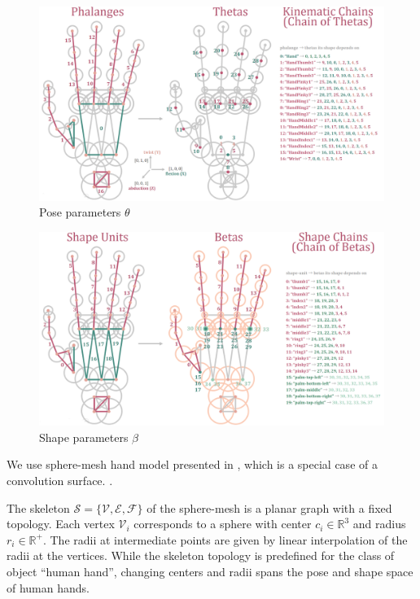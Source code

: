 \begin{figure}[h!]
\centering
\includegraphics[width=1\linewidth]{figures/thetas}
\caption{Pose parameters $\theta$}
\label{fig:thetas}
\end{figure}

\begin{figure}[h!]
\centering
\includegraphics[width=1\linewidth]{figures/betas}
\caption{Shape parameters $\beta$}
\label{fig:betas}
\end{figure}

We use sphere-mesh hand model presented in \cite{tkach2016sphere}, which is a special case of a convolution surface. \textbf{\color{accent}{Maybe briefly recap advantages of sphere-meshes hand model representation}}. 

The skeleton $\mathcal{S} = \{\mathcal{V}, \mathcal{E}, \mathcal{F}\}$ of the sphere-mesh is a planar graph with a fixed topology. Each vertex $\mathcal{V}_i$ corresponds to a sphere with center $c_i \in \mathbb{R}^3$ and radius $r_i \in \mathbb{R}^+$. The radii at intermediate points are given by linear interpolation of the radii at the vertices.
While the skeleton topology is predefined for the class of object ``human hand'', changing centers and radii spans the pose and shape space of human hands.

